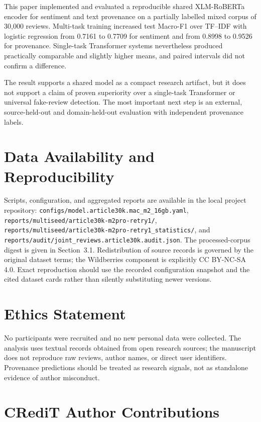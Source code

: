 \documentclass[11pt,a4paper]{article}
\newcommand{\repo}[1]{\nolinkurl{#1}}
\begin{document}
This paper implemented and evaluated a reproducible shared XLM-RoBERTa encoder for sentiment and text provenance on a partially labelled mixed corpus of 30,000 reviews. Multi-task training increased test Macro-F1 over TF--IDF with logistic regression from 0.7161 to 0.7709 for sentiment and from 0.8998 to 0.9526 for provenance. Single-task Transformer systems nevertheless produced practically comparable and slightly higher means, and paired intervals did not confirm a difference.

The result supports a shared model as a compact research artifact, but it does not support a claim of proven superiority over a single-task Transformer or universal fake-review detection. The most important next step is an external, source-held-out and domain-held-out evaluation with independent provenance labels.

\section*{Data Availability and Reproducibility}

Scripts, configuration, and aggregated reports are available in the local project repository: \repo{configs/model.article30k.mac\_m2\_16gb.yaml}, \repo{reports/multiseed/article30k-m2pro-retry1/}, \repo{reports/multiseed/article30k-m2pro-retry1\_statistics/}, and \repo{reports/audit/joint\_reviews.article30k.audit.json}. The processed-corpus digest is given in Section~3.1. Redistribution of source records is governed by the original dataset terms; the Wildberries component is explicitly CC BY-NC-SA 4.0. Exact reproduction should use the recorded configuration snapshot and the cited dataset cards rather than silently substituting newer versions.

\section*{Ethics Statement}

No participants were recruited and no new personal data were collected. The analysis uses textual records obtained from open research sources; the manuscript does not reproduce raw reviews, author names, or direct user identifiers. Provenance predictions should be treated as research signals, not as standalone evidence of author misconduct.

\section*{CRediT Author Contributions}
\end{document}
